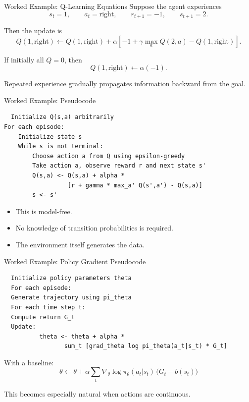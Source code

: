 \documentclass{beamer}
\begin{document}
\begin{frame}{Worked Example: Q-Learning Equations}
  Suppose the agent experiences
  \[
  s_t=1,\qquad a_t=\text{right},\qquad r_{t+1}=-1,\qquad s_{t+1}=2.
  \]

  Then the update is
  \[
  Q(1,\text{right}) \leftarrow Q(1,\text{right}) +
  \alpha\left[-1 + \gamma \max_a Q(2,a)-Q(1,\text{right})\right].
  \]

  If initially all $Q=0$, then
  \[
  Q(1,\text{right}) \leftarrow \alpha(-1).
  \]

  Repeated experience gradually propagates information backward from the goal.
\end{frame}

\begin{frame}{Worked Example: Pseudocode}
  \small
\begin{verbatim}
  Initialize Q(s,a) arbitrarily
For each episode:
    Initialize state s
    While s is not terminal:
        Choose action a from Q using epsilon-greedy
        Take action a, observe reward r and next state s'
        Q(s,a) <- Q(s,a) + alpha *
                  [r + gamma * max_a' Q(s',a') - Q(s,a)]
        s <- s'
\end{verbatim}

\begin{itemize}
\item This is model-free.
\item No knowledge of transition probabilities is required.
\item The environment itself generates the data.
\end{itemize}
\end{frame}

\begin{frame}{Worked Example: Policy Gradient Pseudocode}
  \small
\begin{verbatim}
  Initialize policy parameters theta
  For each episode:
  Generate trajectory using pi_theta
  For each time step t:
  Compute return G_t
  Update:
          theta <- theta + alpha *
                 sum_t [grad_theta log pi_theta(a_t|s_t) * G_t]
\end{verbatim}

With a baseline:
\[
\theta \leftarrow \theta + \alpha
\sum_t \nabla_\theta \log \pi_\theta(a_t|s_t)\,
\big(G_t - b(s_t)\big)
\]

This becomes especially natural when actions are continuous.
\end{frame}
\end{document}
